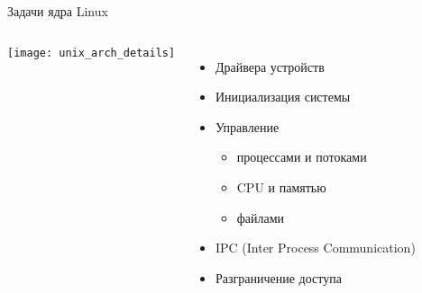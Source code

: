 \begin{frame}[fragile]{Задачи ядра Linux}
    \begin{columns}
        \texttt{[image: unix\_arch\_details]}
	\begin{itemize}
		\item Драйвера устройств
		\item Инициализация системы
		\item Управление
                    \begin{itemize}
                        \item процессами и потоками
                        \item CPU и памятью
                        \item файлами
                    \end{itemize}
		\item IPC (Inter Process Communication)
		\item Разграничение доступа
	\end{itemize}
    \end{columns}
\end{frame}
